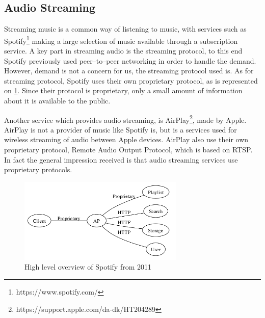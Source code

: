 \subsection{Audio Streaming}
Streaming music is a common way of listening to music, with services such as Spotify\footnote{https://www.spotify.com/} making a large selection of music available through a subscription service.
A key part in streaming audio is the streaming protocol, to this end Spotify previously used peer--to--peer networking in order to handle the demand.\cite{spotify1}
However, demand is not a concern for us, the streaming protocol used is.
As for streaming protocol, Spotify uses their own proprietary protocol, as is represented on \cref{fig:spotifyOverview}.\cite{spotifySlides} %
Since their protocol is proprietary, only a small amount of information about it is available to the public.

Another service which provides audio streaming, is AirPlay\footnote{https://support.apple.com/da-dk/HT204289}, made by Apple. 
AirPlay is not a provider of music like Spotify is, but is a services used for wireless streaming of audio between Apple devices.
AirPlay also use their own proprietary protocol, Remote Audio Output Protocol, which is based on \ac{RTSP}.
In fact the general impression received is that audio streaming services use proprietary protocols.




\begin{figure}[!bht]
    \centering
    \includegraphics[width=0.7\textwidth]{img/spotifyOverview.png}
    \caption{High level overview of Spotify from 2011 \cite{spotifySlides}}
    \label{fig:spotifyOverview}
\end{figure}


